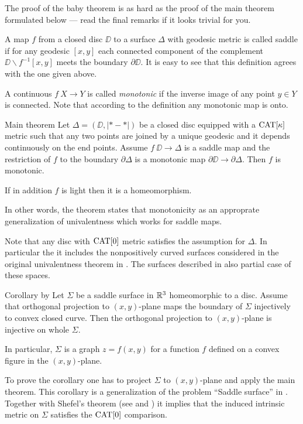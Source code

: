 \documentclass{article}
\begin{document}
The proof of the baby theorem is as hard as the proof of the main theorem formulated below --- read the final remarks if it looks trivial for you.

A map $f$ from a closed disc $\DD$ to a surface $\Delta$ with geodesic metric is called saddle if for any geodesic $[x,y]$ each connected component of the complement $\DD\backslash f^{-1}[x,y]$ meets the boundary $\partial\DD$.
It is easy to see that this definition agrees with the one given above.

A continuous  $f\:X\to Y$ is called \emph{monotonic} if the inverse image of any point $y\in Y$ is connected.
Note that according to the definition any monotonic map is onto.

\begin{thm}{Main theorem}\label{thm:main}
Let $\Delta=(\DD,|{*}-{*}|)$ be a closed disc equipped with a $\mathop{\rm CAT}\nolimits[\kappa]$ metric such that any two points are joined by a unique geodesic and it depends continuously on the end points.
Assume $f\:\DD\to \Delta$ is a saddle map and the restriction of $f$ to the boundary $\partial\Delta$ is a monotonic map $\partial\DD\to  \partial\Delta$.
Then $f$ is monotonic. 

If in addition $f$ is light then it is a homeomorphism.
\end{thm}

In other words, the theorem states that monotonicity as an approprate generalization of univalentness which works for saddle maps.

Note that any disc with $\mathop{\rm CAT}\nolimits[0]$ metric satisfies the assumption for $\Delta$.
In particular the it includes the nonpositively curved surfaces considered in the original univalentness theorem in \cite{schoen-yau}.
The surfaces described in \cite{jost} also partial case of these spaces.

\begin{thm}{Corollary}
by Let $\Sigma$ be a saddle surface in $\mathbb{R}^3$ homeomorphic to a disc.
Assume that orthogonal projection to $(x,y)$-plane
maps the boundary of $\Sigma$
injectively to convex closed curve.
Then the orthogonal projection to $(x,y)$-plane is injective on whole $\Sigma$.

In particular, $\Sigma$ is a graph $z=f(x,y)$ for a function $f$ defined on a convex figure in the $(x,y)$-plane.
\end{thm}

To prove the corollary one has to project $\Sigma$ to $(x,y)$-plane and apply the main theorem.
This corollary is a generalization of the problem ``Saddle surface'' in \cite{petrunin-orthodox}.
Together with Shefel's theorem (see \cite{shefel-3D} and \cite[4.5.5]{akp}) it implies that the induced intrinsic metric on $\Sigma$ satisfies the $\mathop{\rm CAT}\nolimits[0]$ comparison. 
\end{document}
